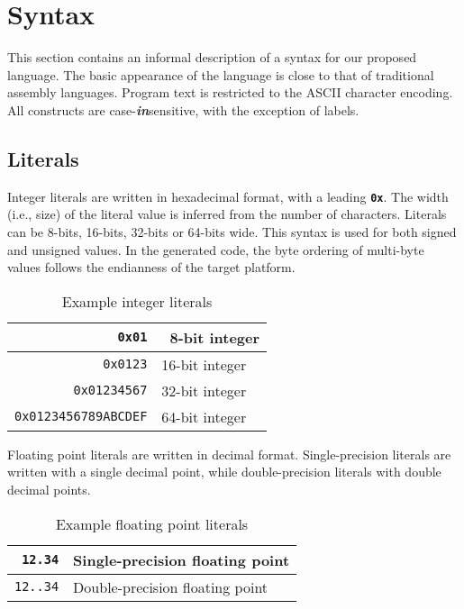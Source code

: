 \section{Syntax}

This section contains an informal description
of a syntax for our proposed language.
The basic appearance of the language is close
to that of traditional assembly languages.
Program text is restricted to the ASCII
character encoding. All constructs are case-\emph{\textbf{in}}sensitive,
with the exception of labels.

\subsection{Literals}

Integer literals are written in hexadecimal format, with a leading
\textbf{\texttt{0x}}. The width (i.e., size) of the literal value is
inferred from the number of characters. Literals can be 8-bits, 16-bits,
32-bits or 64-bits wide. This syntax is used for both signed and unsigned values.
In the generated code, the byte ordering of multi-byte values follows the endianness
of the target platform.

\begin{table}[h!]
  \begin{center}
    \begin{tabular}{|r|l|}
      \hline
      \texttt{0x01}               & \ 8-bit integer  \\ \hline
      \texttt{0x0123}             &   16-bit integer \\ \hline
      \texttt{0x01234567}         &   32-bit integer \\ \hline
      \texttt{0x0123456789ABCDEF} &   64-bit integer \\ \hline
    \end{tabular}
  \end{center}
  \caption{Example integer literals}
\end{table}

Floating point literals are written in decimal format. Single-precision literals
are written with a single decimal point, while double-precision
literals with double decimal points.

\begin{table}[h!]
  \begin{center}
    \begin{tabular}{|r|l|}
      \hline
      \texttt{12.34}  & Single-precision floating point \\ \hline
      \texttt{12..34} & Double-precision floating point \\ \hline
    \end{tabular}
  \end{center}
  \caption{Example floating point literals}
\end{table}

